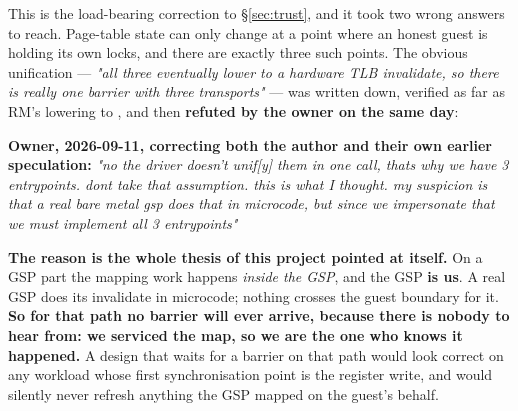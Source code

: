 \documentclass[10.5pt]{article}
\begin{document}
This is the load-bearing correction to \S\ref{sec:trust}, and it took two wrong answers to reach.
Page-table state can only change at a point where an honest guest is holding its own locks, and
there are exactly three such points. The obvious unification --- \emph{"all three eventually
lower to a hardware TLB invalidate, so there is really one barrier with three transports"} ---
was written down, verified as far as RM's  lowering to
, and then \textbf{refuted by the owner on the same day}:

\begin{claimbox}\small
\textbf{Owner, 2026-09-11, correcting both the author and their own earlier speculation:}
\emph{"no the driver doesn't unif[y] them in one call, thats why we have 3 entrypoints. dont take
that assumption. this is what I thought. my suspicion is that a real bare metal gsp does that in
microcode, but since we impersonate that we must implement all 3 entrypoints"}
\hfill {}
\end{claimbox}

\textbf{The reason is the whole thesis of this project pointed at itself.} On a GSP part the
mapping work happens \emph{inside the GSP}, and the GSP \textbf{is us}. A real GSP does its
invalidate in microcode; nothing crosses the guest boundary for it. \textbf{So for that path no
barrier will ever arrive, because there is nobody to hear from: we serviced the map, so we are
the one who knows it happened.} A design that waits for a barrier on that path would look correct
on any workload whose first synchronisation point is the register write, and would silently never
refresh anything the GSP mapped on the guest's behalf.
\end{document}
